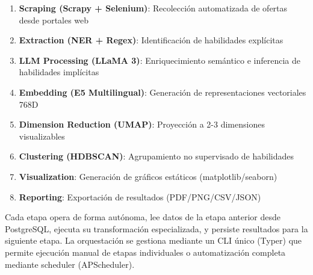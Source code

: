 \begin{enumerate}
    \item \textbf{Scraping (Scrapy + Selenium)}: Recolección automatizada de ofertas desde portales web
    \item \textbf{Extraction (NER + Regex)}: Identificación de habilidades explícitas
    \item \textbf{LLM Processing (LLaMA 3)}: Enriquecimiento semántico e inferencia de habilidades implícitas
    \item \textbf{Embedding (E5 Multilingual)}: Generación de representaciones vectoriales 768D
    \item \textbf{Dimension Reduction (UMAP)}: Proyección a 2-3 dimensiones visualizables
    \item \textbf{Clustering (HDBSCAN)}: Agrupamiento no supervisado de habilidades
    \item \textbf{Visualization}: Generación de gráficos estáticos (matplotlib/seaborn)
    \item \textbf{Reporting}: Exportación de resultados (PDF/PNG/CSV/JSON)
\end{enumerate}

Cada etapa opera de forma autónoma, lee datos de la etapa anterior desde PostgreSQL, ejecuta su transformación especializada, y persiste resultados para la siguiente etapa. La orquestación se gestiona mediante un CLI único (Typer) que permite ejecución manual de etapas individuales o automatización completa mediante scheduler (APScheduler).

